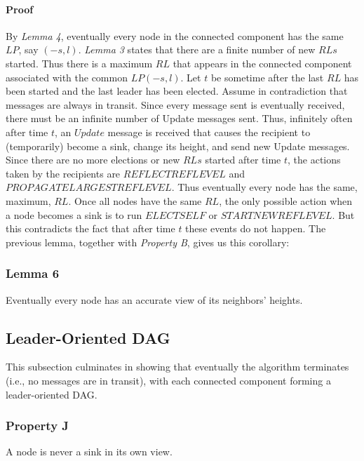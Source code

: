 \documentclass{article}
\begin{document}
\paragraph{Proof}
By \textit{Lemma 4}, eventually every node in the connected component has the same $LP$, say $(−s, l)$. \textit{Lemma 3} states that there are a finite number of new $RLs$ started.
Thus there is a maximum $RL$ that appears in the connected component associated with the common $LP(−s, l)$. Let $t$ be sometime after the last $RL$ has been started and the last leader has been elected. Assume in contradiction that messages are always in transit. Since every message sent is eventually received, there must be an infinite number of Update messages sent. Thus, infinitely often after time $t$, an $Update$ message is received that causes the recipient to (temporarily) become a sink, change its height, and send new Update messages. Since there are no more elections or new $RLs$ started after time $t$, the actions taken by the recipients are $REFLECTREFLEVEL$ and $PROPAGATELARGESTREFLEVEL$. Thus eventually every node has the same, maximum, $RL$. Once all nodes have the same $RL$, the only possible action when a node becomes a sink is to run $ELECTSELF$ or $STARTNEWREFLEVEL$. But this contradicts the fact that after time $t$ these events do not happen.
The previous lemma, together with \textit{Property B}, gives us this corollary:

\subsubsection{Lemma 6}
Eventually every node has an accurate view of its neighbors’ heights.

\subsection{Leader-Oriented DAG}
This subsection culminates in showing that eventually the algorithm terminates (i.e., no messages are in transit), with each connected component forming a leader-oriented DAG.

\subsubsection{Property J}
A node is never a sink in its own view.
\end{document}

